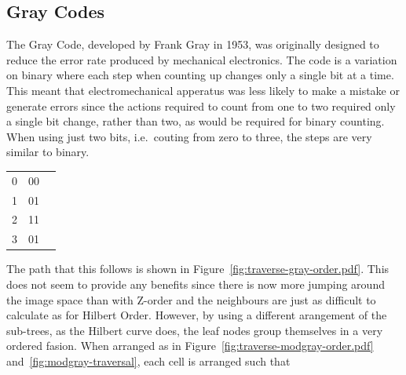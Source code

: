 \subsection{Gray Codes}
\label{sub:gray_codes}

The Gray Code\cite{gray1953pulse}, developed by Frank Gray in 1953, was
originally designed to reduce the error rate produced by mechanical
electronics. The code is a variation on binary where each step when counting
up changes only a single bit at a time. This meant that electromechanical
apperatus was less likely to make a mistake or generate errors since the
actions required to count from one to two required only a single bit change,
rather than two, as would be required for binary counting. When using just two
bits, i.e.\ couting from zero to three, the steps are very similar to binary.

\begin{tabular}{c c l}
0 & 00 \\
1 & 01 \\
2 & 11 \\
3 & 01
\end{tabular}

The path that this follows is shown in
Figure~\ref{fig:traverse-gray-order.pdf}. This does not seem to provide any
benefits since there is now more jumping around the image space than with
Z-order and the neighbours are just as difficult to calculate as for Hilbert
Order. However, by using a different arangement of the sub-trees, as the
Hilbert curve does, the leaf nodes group themselves in a very ordered
fasion. When arranged as in Figure~\ref{fig:traverse-modgray-order.pdf}
and~\ref{fig:modgray-traversal}, each cell is arranged such that


